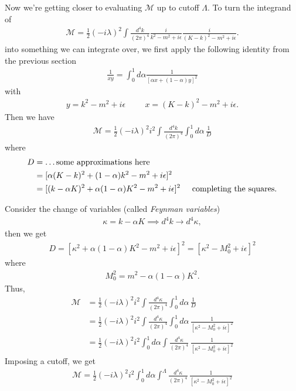 \documentclass{book}
\theoremstyle{definition}
\newcommand{\f}[2]{\frac{#1}{#2}}
\begin{document}
Now we're getting closer to evaluating $\mathcal{M}$ up to cutoff $\Lambda$. To turn the integrand of
\begin{align}
\mathcal{M} = \f{1}{2}(-i\lambda)^2\int \f{d^4k}{(2\pi)^4}\f{i}{k^2 - m^2 + i\epsilon}\f{i}{(K - k)^2 - m^2 + i\epsilon}.
\end{align}
into something we can integrate over, we first apply the following identity from the previous section
\begin{align}
\f{1}{xy} = \int^1_0 d\alpha \f{1}{[\alpha x + (1-\alpha )y]^2}
\end{align}
with 
\begin{align}
y = k^2 - m^2 + i\epsilon \hspace{1cm} x = (K - k)^2 - m^2 + i\epsilon.
\end{align}
Then we have
\begin{align}
\mathcal{M} = \f{1}{2}(-i\lambda)^2 i^2 \int \f{d^4k}{(2\pi)^4}\int^1_0 d\alpha\, \f{1}{D}
\end{align}
where
\begin{align}
D &=  \dots \nonumber \text{some approximations here}\\
& =[\alpha(K-k)^2 + (1-\alpha)k^2 - m^2 + i\epsilon]^2 \nonumber\\
&= [(k - \alpha K)^2 + \alpha(1-\alpha)K^2- m^2   + i\epsilon]^2 \nonumber \hspace{0.5cm}\text{completing the squares}.
\end{align}

Consider the change of variables (called \textit{Feynman variables})
\begin{align}
\kappa =  k - \alpha K \implies d^4k \to d^4\kappa,
\end{align}
then we get
\begin{align}
D = [\kappa^2 + \alpha(1-\alpha)K^2 - m^2 + i\epsilon]^2 = [\kappa^2 - M_0^2 + i\epsilon ]^2
\end{align}
where
\begin{align}
M_0^2 = m^2  - \alpha(1 - \alpha)K^2.
\end{align}
Thus,
\begin{align}
\mathcal{M} &= \f{1}{2}(-i\lambda)^2 i^2 \int \f{d^4\kappa}{(2\pi)^4} \int^1_0 d\alpha\,\f{1}{D} \nonumber\\
&= \f{1}{2}(-i\lambda)^2 i^2 \int \f{d^4\kappa}{(2\pi)^4}  \int^1_0 d\alpha \, \f{1}{[\kappa^2 - M_0^2 + i\epsilon ]^2}\nonumber\\
&= {\f{1}{2}(-i\lambda)^2 i^2  \int^1_0 d\alpha \int \f{d^4\kappa}{(2\pi)^4}  \, \f{1}{[\kappa^2 - M_0^2 + i\epsilon ]^2}}
\end{align}
Imposing a cutoff, we get
\begin{align}
\boxed{\mathcal{M} = \f{1}{2}(-i\lambda)^2 i^2  \int^1_0 d\alpha \int^\Lambda \f{d^4\kappa}{(2\pi)^4}  \, \f{1}{[\kappa^2 - M_0^2 + i\epsilon ]^2}}
\end{align}
\end{document}
